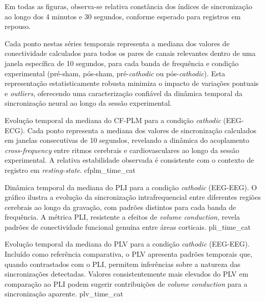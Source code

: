Em todas as figuras, observa-se relativa constância dos índices de sincronização ao longo dos 4 minutos e 30 segundos, conforme esperado para registros em repouso.

Cada ponto nestas séries temporais representa a mediana dos valores de conectividade calculados para todos os pares de canais relevantes dentro de uma janela específica de 10 segundos, para cada banda de frequência e condição experimental (pré-sham, pós-sham, pré-\textit{cathodic} ou pós-\textit{cathodic}). Esta representação estatisticamente robusta minimiza o impacto de variações pontuais e \textit{outliers}, oferecendo uma caracterização confiável da dinâmica temporal da sincronização neural ao longo da sessão experimental.

{Evolução temporal da mediana do CF-PLM para a condição \textit{cathodic} (EEG-ECG). Cada ponto representa a mediana dos valores de sincronização calculados em janelas consecutivas de 10 segundos, revelando a dinâmica do acoplamento \textit{cross-frequency} entre ritmos cerebrais e cardiovasculares ao longo da sessão experimental. A relativa estabilidade observada é consistente com o contexto de registro em \textit{resting-state}.}
{cfplm_time_cat}

{Dinâmica temporal da mediana do PLI para a condição \textit{cathodic} (EEG-EEG). O gráfico ilustra a evolução da sincronização intrafrequencial entre diferentes regiões cerebrais ao longo da gravação, com padrões distintos para cada banda de frequência. A métrica PLI, resistente a efeitos de \textit{volume conduction}, revela padrões de conectividade funcional genuína entre áreas corticais.}
{pli_time_cat}

{Evolução temporal da mediana do PLV para a condição \textit{cathodic} (EEG-EEG). Incluído como referência comparativa, o PLV apresenta padrões temporais que, quando contrastados com o PLI, permitem inferências sobre a natureza das sincronizações detectadas. Valores consistentemente mais elevados do PLV em comparação ao PLI podem sugerir contribuições de \textit{volume conduction} para a sincronização aparente.}
{plv_time_cat}